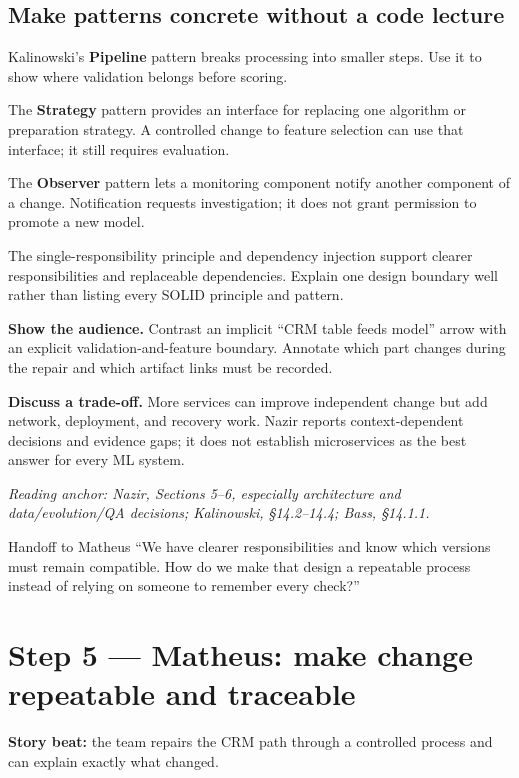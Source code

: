 \documentclass[12pt,a4paper]{article}
\newcommand{\source}[1]{\par\textcolor{teal!70!black}{\textit{Reading anchor: #1}}\par}
\begin{document}
\subsection{Make patterns concrete without a code lecture}
Kalinowski's \textbf{Pipeline} pattern breaks processing into smaller steps. Use it to show where validation belongs before scoring.

The \textbf{Strategy} pattern provides an interface for replacing one algorithm or preparation strategy. A controlled change to feature selection can use that interface; it still requires evaluation.

The \textbf{Observer} pattern lets a monitoring component notify another component of a change. Notification requests investigation; it does not grant permission to promote a new model.

The single-responsibility principle and dependency injection support clearer responsibilities and replaceable dependencies. Explain one design boundary well rather than listing every SOLID principle and pattern.

\textbf{Show the audience.} Contrast an implicit ``CRM table feeds model'' arrow with an explicit validation-and-feature boundary. Annotate which part changes during the repair and which artifact links must be recorded.

\textbf{Discuss a trade-off.} More services can improve independent change but add network, deployment, and recovery work. Nazir reports context-dependent decisions and evidence gaps; it does not establish microservices as the best answer for every ML system.

\source{Nazir, Sections 5--6, especially architecture and data/evolution/QA decisions; Kalinowski, \S14.2--14.4; Bass, \S14.1.1.}

\begin{handoffbox}{Handoff to Matheus}
``We have clearer responsibilities and know which versions must remain compatible. How do we make that design a repeatable process instead of relying on someone to remember every check?''
\end{handoffbox}

\section{Step 5 --- Matheus: make change repeatable and traceable}
\textbf{Story beat:} the team repairs the CRM path through a controlled process and can explain exactly what changed.
\end{document}
